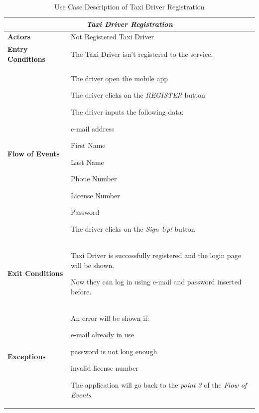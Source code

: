 \documentclass[a4paper]{article}
\begin{document}
\begin{table} [H]
\begin{center}
\begin{tabular}{ |m{}|m{}|  }
\hline
    \multicolumn{2}{|c|}{\textbf{\textit{Taxi Driver Registration}}} \\
\hline \hline
    \textbf{Actors}
&   Not Registered Taxi Driver
\\ \hline
    \textbf{Entry Conditions}
&   The Taxi Driver isn't registered to the service.
\\ \hline
    \textbf{Flow of Events}
& 
    \begin{enumerate*}
    \item The driver open the mobile app
    \item The driver clicks on the \emph{REGISTER} button
    \item The driver inputs the following data:
        \begin{enumerate*}
        \item e-mail address
        \item First Name
        \item Last Name
        \item Phone Number
        \item License Number
        \item Password
        \end{enumerate*}
    \item The driver clicks on the \emph{Sign Up!} button
    \end{enumerate*}
\\ \hline
    \textbf{Exit Conditions}
&   Taxi Driver is successfully registered and the login page will be shown. 

    Now they can log in using e-mail and password inserted before.
\\ \hline
    \textbf{Exceptions}
&   
    An error will be shown if:
    \begin{itemize*}
    \item e-mail already in use
    \item password is not long enough
    \item invalid license number
    \end{itemize*}
    The application will go back to the \emph{point 3} of the \emph{Flow of Events} 
\\ \hline
\end{tabular}
\end{center}
\caption{Use Case Description of Taxi Driver Registration}
\label{table:taxiregistration}
\end{table}
\end{document}
